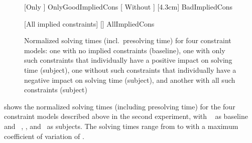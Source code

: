 \begin{figure}
  \centering%

                      [Only ]
                      {OnlyGoodImpliedCons}%
  \hfill%
                      [%
                        Without
                      ]%
                      [4.3cm]%
                      {BadImpliedCons}%

  \vspace{\betweensubfigures}

                      [All implied constraints]%
                      [\linewidth]%
                      {AllImpliedCons}%

  \caption[%
            Plot for evaluating the impact on solving time made by different
            combinations of implied constraints%
          ]%
          {%
            Normalized solving times (incl.\ presolving time) for four
            constraint models: one with no implied constraints (baseline), one
            with only such constraints that individually have a positive impact
            on solving time (subject), one without such constraints that
            individually have a negative impact on solving time (subject), and
            another with all such constraints (subject)%
          }
\end{figure}

 shows the normalized solving
times (including \gls{presolving} time) for the four \glspl{constraint model}
described above in the second experiment, with ~\modelC{} as \gls{baseline} and ~\modelD,
\modelE, and~\modelF{} as \glspl{subject}.
%
The solving times range from
\printMinSolvingTime{
  \SolvTechEnableOnlyGoodImpliedConsPrePlusSolvingTimeSpeedupNonePrePlusSolvingTimeAvgMin,
  \SolvTechEnableOnlyGoodImpliedConsPrePlusSolvingTimeSpeedupPrePlusSolvingTimeAvgMin,
  \SolvTechDisableBadImpliedConsPrePlusSolvingTimeSpeedupPrePlusSolvingTimeAvgMin,
  \SolvTechDisableAllImpliedConsPrePlusSolvingTimeSpeedupPrePlusSolvingTimeAvgMin
} to
\printMaxSolvingTime{
  \SolvTechEnableOnlyGoodImpliedConsPrePlusSolvingTimeSpeedupNonePrePlusSolvingTimeAvgMax,
  \SolvTechEnableOnlyGoodImpliedConsPrePlusSolvingTimeSpeedupPrePlusSolvingTimeAvgMax,
  \SolvTechDisableBadImpliedConsPrePlusSolvingTimeSpeedupPrePlusSolvingTimeAvgMax,
  \SolvTechDisableAllImpliedConsPrePlusSolvingTimeSpeedupPrePlusSolvingTimeAvgMax
} with a maximum coefficient of variation of
\numMaxOf{
  \SolvTechEnableOnlyGoodImpliedConsPrePlusSolvingTimeSpeedupNonePrePlusSolvingTimeCvMax,
  \SolvTechEnableOnlyGoodImpliedConsPrePlusSolvingTimeSpeedupPrePlusSolvingTimeCvMax,
  \SolvTechDisableBadImpliedConsPrePlusSolvingTimeSpeedupPrePlusSolvingTimeCvMax,
  \SolvTechDisableAllImpliedConsPrePlusSolvingTimeSpeedupPrePlusSolvingTimeCvMax
}.

